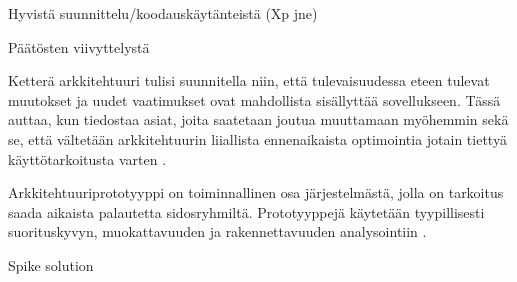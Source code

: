 Hyvistä suunnittelu/koodauskäytänteistä (Xp jne)

Päätösten viivyttelystä

Ketterä arkkitehtuuri tulisi suunnitella niin, että tulevaisuudessa eteen tulevat muutokset ja uudet vaatimukset ovat mahdollista sisällyttää sovellukseen. Tässä auttaa, kun tiedostaa asiat, joita saatetaan joutua muuttamaan myöhemmin sekä se, että vältetään arkkitehtuurin liiallista ennenaikaista optimointia jotain tiettyä käyttötarkoitusta varten 
\citep{waterman_agility_2018_a}.  

Arkkitehtuuriprototyyppi on toiminnallinen osa järjestelmästä, jolla on tarkoitus saada aikaista palautetta sidosryhmiltä. Prototyyppejä käytetään tyypillisesti suorituskyvyn, muokattavuuden ja rakennettavuuden analysointiin \citep{babar_agile_2013}. 

Spike solution

\fi
